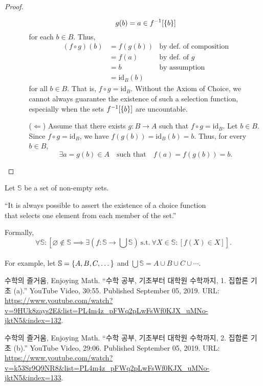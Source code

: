 \documentclass[11pt,openany]{article}
\begin{document}
\begin{proof}
\begin{enumerate}[(1)]
\begin{itemize}
\[		g(b)=a\in f^{-1}[\set{b}]
		\] for each $b\in B$. Thus, \begin{align*}
			(f\circ g)(b) &= f(g(b))&\text{by def. of composition} \\
			&=f(a) &\text{by def. of $g$} \\
			&=b &\text{by assumption} \\
			&=\text{id}_B(b)
		\end{align*} for all $b\in B$. That is, $f\circ g=\text{id}_B$. Without the Axiom of Choice, we cannot always guarantee the existence of such a selection function, especially when the sets $f^{-1}[\set{b}]$ are uncountable.
		\vspace{12pt}
		\item[($\Leftarrow$)] Assume that there exists $g:B\to A$ such that $f\circ g=\text{id}_B$. Let $b\in B$. Since $f\circ g=\text{id}_B$, we have $f(g(b))=\text{id}_B(b)=b$. Thus, for every $b\in B$, \[
		\exists a=g(b)\in A\quad\text{such that}\quad f(a)=f(g(b))=b.
		\]
	\end{itemize}
\end{enumerate}
\end{proof}

\newpage
\begin{note}
	Let $\mathbb{S}$ be a set of non-empty sets. \begin{center}
		``It is always possible to assert the existence of a choice function\\ that selects one element from each member of the set.''
	\end{center} Formally, \[
	\forall\mathbb{S}:\left[\varnothing\notin \mathbb{S}\implies\exists\left(f:\mathbb{S}\to\bigcup\mathbb{S}\right)\ \text{s.t.}\ \forall X\in\mathbb{S}:[f(X)\in X]\right].
	\] 
	\vspace{24pt} \\
	\noindent For example, let $\mathbb{S}=\set{A,B,C,\dots}$ and $\bigcup\mathbb{S}=A\cup B\cup C\cup\cdots$.
	\begin{figure}[h!]\centering
		
	\end{figure}
\end{note}
\vfill
\begin{thebibliography}{9}
	수학의 즐거움, Enjoying Math. ``수학 공부, 기초부터 대학원 수학까지, 1. 집합론 기초 (a).'' YouTube Video, 30:55. Published 
	September 05, 2019. URL: \url{https://www.youtube.com/watch?v=9HUk8zays2E&list=PL4m4z_pFWq2pLwFsWf0KJX_uMNo-jktN5&index=132}.
	
	수학의 즐거움, Enjoying Math. ``수학 공부, 기초부터 대학원 수학까지, 2. 집합론 기초 (b).'' YouTube Video, 29:06. Published 
	September 05, 2019. URL: \url{https://www.youtube.com/watch?v=k53Sr9Q9NR8&list=PL4m4z_pFWq2pLwFsWf0KJX_uMNo-jktN5&index=133}.
\end{thebibliography}
\end{document}
